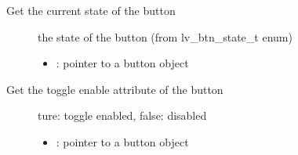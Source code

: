 \documentclass[letterpaper,10pt,english]{sphinxmanual}
\begin{document}
\begin{fulllineitems}
\label{\detokenize{object-types/btn:_CPPv416lv_btn_get_statePK8lv_obj_t}}%
\pysigstartmultiline
{}\label{\detokenize{object-types/btn:lv__btn_8h_1ab2649a6b5c41f95269f3d8c93d34f441}}%
\pysigstopmultiline
Get the current state of the button \begin{description}
\item[{}] \leavevmode
the state of the button (from lv\_btn\_state\_t enum) 

\item[{}] \leavevmode\begin{itemize}
\item {} 
: pointer to a button object 

\end{itemize}

\end{description}


\end{fulllineitems}


\begin{fulllineitems}
\label{\detokenize{object-types/btn:_CPPv417lv_btn_get_togglePK8lv_obj_t}}%
\pysigstartmultiline
{}\label{\detokenize{object-types/btn:lv__btn_8h_1acd0ec2a441c5d23e9b9baeceabf1010f}}%
\pysigstopmultiline
Get the toggle enable attribute of the button \begin{description}
\item[{}] \leavevmode
ture: toggle enabled, false: disabled 

\item[{}] \leavevmode\begin{itemize}
\item {} 
: pointer to a button object 

\end{itemize}

\end{description}


\end{fulllineitems}
\end{document}

